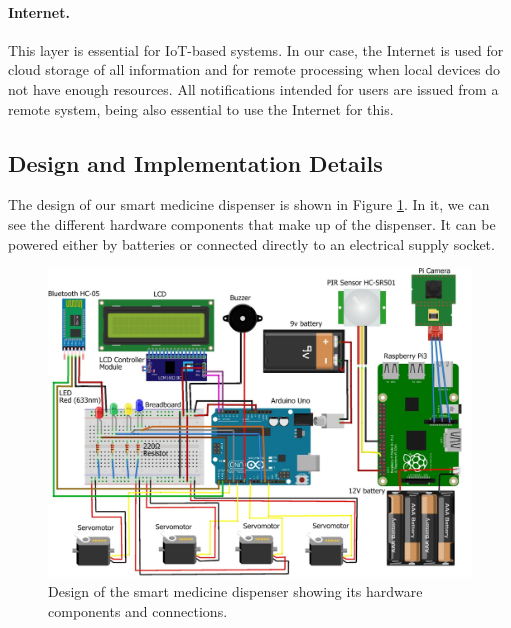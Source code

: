 \documentclass{IOS-Book-Article}
\begin{document}
\paragraph{Internet. }

This layer is essential for IoT-based systems. In our case, the Internet is used for cloud storage of all information and for remote processing when local devices do not have enough resources. All notifications intended for users are issued from a remote system, being also essential to use the Internet for this.

\subsection{Design and Implementation Details}

The design of our smart medicine dispenser is shown in Figure \ref{figures:Diagram}. In it, we can see the different hardware components that make up of the dispenser. It can be powered either by batteries or connected directly to an electrical supply socket.

\begin{figure}[htb]
	\centering\includegraphics{DispenserDiagram.png}
	\caption{{Design of the smart medicine dispenser showing its hardware components and connections.}}
	\label{figures:Diagram}
\end{figure}
\end{document}
